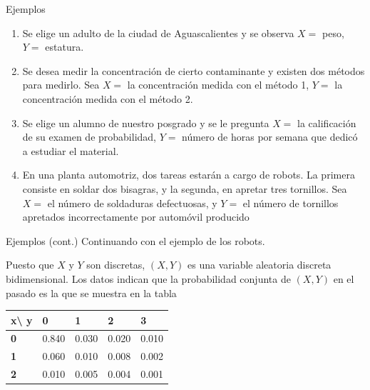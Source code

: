 \documentclass[11pt]{beamer}
\begin{document}
\begin{frame}{Ejemplos}
\begin{enumerate}
\item Se elige un adulto de la ciudad de Aguascalientes y se observa $X=$ peso,  $Y=$ estatura.
\item Se desea medir la concentración de cierto contaminante y existen dos métodos para medirlo. Sea $X=$ la concentración medida con el método 1, $Y=$ la concentración medida con el método 2.
\item Se elige un alumno de nuestro posgrado y se le pregunta $X=$ la calificación de su examen de probabilidad, $Y=$ número de horas por semana que dedicó a estudiar el material.
\item  En una planta automotriz, dos tareas estarán a cargo de robots. La primera consiste en soldar dos bisagras, y la segunda, en apretar tres tornillos. Sea $X=$ el número de soldaduras defectuosas, y $Y=$ el número de tornillos apretados incorrectamente por automóvil producido
\end{enumerate}
\end{frame}


\begin{frame}{Ejemplos (cont.)}
Continuando con el ejemplo de los robots. 

Puesto que $X$ y $Y$ son discretas, $(X,Y )$ es una variable aleatoria discreta bidimensional. Los datos indican que la probabilidad conjunta de $(X, Y )$ en el pasado es la que se muestra en la tabla
\begin{table}[]
\begin{tabular}{|l|l|l|l|l|}
\hline
x\textbackslash{} \textbf{y} & \textbf{0}     & \textbf{1}     & \textbf{2}     & \textbf{3}     \\ \hline
\textbf{0}                  & 0.840 & 0.030 & 0.020 & 0.010 \\ \hline
\textbf{1}                  & 0.060 & 0.010 & 0.008 & 0.002 \\ \hline
\textbf{2}                  & 0.010 & 0.005 & 0.004 & 0.001 \\ \hline
\end{tabular}
\end{table}
\end{frame}
\end{document}
